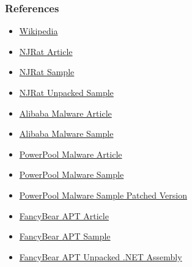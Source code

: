 \documentclass[aspectratio=169]{beamer}
\begin{document}
\begin{frame}
  \frametitle{References}
  \begin{center}
    \begin{itemize}
    \item{\href{https://en.wikipedia.org/wiki/Main_Page}{Wikipedia}}
    \item{\href{https://ti.360.net/blog/articles/analysis-of-apt-c-27/}{NJRat Article}}
    \item{\href{https://www.virustotal.com/\#/file/0a9c88d03260b92608c9c079a1b449cf46e5cd764f12f2ec852038dd6bd0fa97/detection}{NJRat Sample}}
    \item{\href{https://www.virustotal.com/\#/file/4e51a6779a7776055ebdeffe28d00e8866b2e722e3ccb6cba868cf8cdc86b1a3/detection}{NJRat Unpacked Sample}}
    \item{\href{http://sfkino.tistory.com/70}{Alibaba Malware Article}}
    \item{\href{https://www.virustotal.com/\#/file/d057088d0de3d920ea0939217c756274018b6e89cbfc74f66f50a9d27a384b09/detection}{Alibaba Malware Sample}}
    \item{\href{https://www.welivesecurity.com/2018/09/05/powerpool-malware-exploits-zero-day-vulnerability/}{PowerPool Malware Article}}
    \item{\href{https://www.virustotal.com/\#/file/58a50840c04cd15f439f1cc1b684e9f9fa22c0d64f44a391d9e2b1222e5cd6bd/details}{PowerPool Malware Sample}}
    \item{\href{https://www.virustotal.com/\#/file/9c08136b26ee5234c61a5d9e5a17afb15da35efc66514d2df5b53178693644c5/detection}{PowerPool Malware Sample Patched Version}}
    \item{\href{https://www.symantec.com/security-center/writeup/2018-092116-1134-99?om_rssid=sr-latestthreats30days\#technicaldescription}{FancyBear APT Article}}
    \item{\href{https://www.virustotal.com/\#/file/a37eda810ca92486bfb0e1f1b27adb7c9df57aafab686c000ae1d6ec5d6f6180/detection}{FancyBear APT Sample}}
    \item{\href{https://www.virustotal.com/\#/file/90e7c99effc7e4360c45a2af7ca9cc23313902a40c30d48cac8db048e9e4c0f6/detection}{FancyBear APT Unpacked .NET Assembly}}
    \end{itemize}
  \end{center}
\end{frame}
\end{document}
